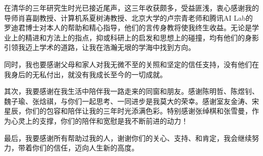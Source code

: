 
\begin{acknowledgements}
在清华的三年研究生时光已接近尾声，这三年收获颇多，受益匪浅，衷心感谢我的导师肖喜副教授、计算机系夏树涛教授、北京大学的卢宗青老师和腾讯AI Lab的罗迪君博士对本人的帮助和精心指导，他们的言传身教将使我终生收益。无论是学业上的精进和方法上的指点，抑或科研上的启发和思想上的碰撞，均有他们的身影引领我迈上学术的道路，让我在浩瀚无垠的学海中找到方向。

同时，我也要感谢父母和家人对我无微不至的关照和坚定的信任支持，没有他们在我身后的无私付出，就没有我成长至今的一切成就。

其次，我要感谢在我生活中陪伴我一路走来的同窗和朋友。感谢陈明哲、陈煜钊、魏子瑜、张焓祺，与你们一起思考、一同进步是我莫大的荣幸。感谢室友金涛、宋星辰，你们的包容和陪伴让我的三年时光添满色彩。特别感谢张绰棋和张雪曼，作为心灵上的支撑，你们的陪伴和宽慰是我不断前进的动力！

最后，我要感谢所有帮助过我的人，谢谢你们的关心、支持、和肯定，我会继续努力，带着你们的信任，迈向人生新的高度。
\end{acknowledgements}

